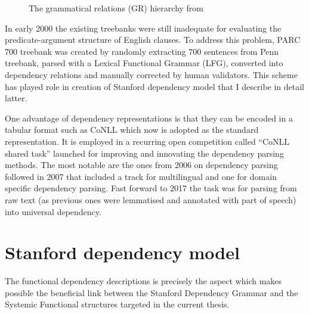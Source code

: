 \begin{figure}[!ht]
    \caption{The grammatical relations (GR) hierarchy from \citet{Carroll1999}}
    \label{fig:grEarly}
\end{figure}

In early 2000 the existing treebanks were still inadequate for evaluating the predicate-argument structure of English clauses. To address this problem, PARC 700 treebank \citep{King2003} was created by randomly extracting 700 sentences from Penn treebank, parsed with a Lexical Functional Grammar (LFG), converted into dependency relations and manually corrected by human validators. This scheme has played role in creation of Stanford dependency model that I describe in detail latter. 

One advantage of dependency representations is that they can be encoded in a tabular format such as CoNLL \citep{nivre2007conll} which now is adopted as the standard representation. It is employed in a recurring open competition called ``CoNLL shared task'' launched for improving and innovating the dependency parsing methods. The most notable are the ones from 2006 on dependency parsing \citep{Buchholz2006} followed in 2007 that included a track for multilingual and one for domain specific dependency parsing. Fast forward to 2017 \citep{zeman2017conll} the task was for parsing from raw text (as previous ones were lemmatised and annotated with part of speech) into universal dependency.

\section{Stanford dependency model}
The functional dependency descriptions is precisely the aspect which makes possible the beneficial link between the Stanford Dependency Grammar and the Systemic Functional structures targeted in the current thesis. 

